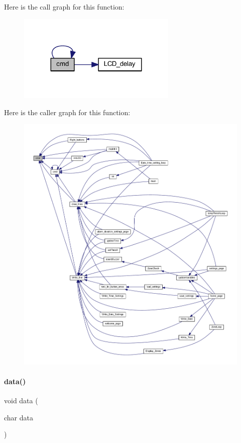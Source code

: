 Here is the call graph for this function\+:
\nopagebreak
\begin{figure}[H]
\begin{center}
\leavevmode
\includegraphics[width=215pt]{a00032_ac1f52f9c871ece7cb377c4fea1c6c79d_cgraph}
\end{center}
\end{figure}
Here is the caller graph for this function\+:
\nopagebreak
\begin{figure}[H]
\begin{center}
\leavevmode
\includegraphics[width=350pt]{a00032_ac1f52f9c871ece7cb377c4fea1c6c79d_icgraph}
\end{center}
\end{figure}
\mbox{\label{a00032_a54955197a7b52d9a202b75527f68cc08}} 
\paragraph{data()}
{\footnotesize\ttfamily void data (\begin{DoxyParamCaption}\item[{char}]{data }\end{DoxyParamCaption})}

